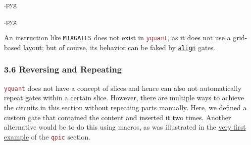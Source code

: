 \documentclass{scrartcl}
\makeatletter
\newenvironment{codeexample}{%
   \VerbatimEnvironment%
   \let\FVB@VerbatimOut\minted@FVB@VerbatimOut
   \let\FVE@VerbatimOut\minted@FVE@VerbatimOut
   \minted@configlang{tex}%
   \minted@fvset
   \begin{VerbatimOut}[codes={\catcode`\^^I=12},firstline,lastline]{\minted@jobname.pyg}%
}{
   \end{VerbatimOut}%
   \minted@langlinenoson%
   \savebox\codeexamplebox{ \minted@jobname.pyg}%
   \ifdim\wd\codeexamplebox>\dimexpr.5\linewidth-3mm\relax%
      \wd\codeexamplebox=.5\linewidth%
   \else%
      \wd\codeexamplebox=\dimexpr\wd\codeexamplebox+3mm\relax%
   \fi%
   \noindent\begin{minipage}{\wd\codeexamplebox}%
      \centering%
      \usebox\codeexamplebox%
   \end{minipage}%
   \begin{minipage}{\dimexpr\linewidth-\wd\codeexamplebox\relax}%
      \expandafter\minted@pygmentize\expandafter{\minted@lang}%
   \end{minipage}%
   \minted@langlinenosoff%
   \par%
}
\newenvironment{codeexample*}{%
   \VerbatimEnvironment%
   \let\FVB@VerbatimOut\minted@FVB@VerbatimOut
   \let\FVE@VerbatimOut\minted@FVE@VerbatimOut
   \minted@configlang{tex}%
   \minted@fvset
   \begin{VerbatimOut}[codes={\catcode`\^^I=12},firstline,lastline]{\minted@jobname.pyg}%
}{
   \end{VerbatimOut}%
   \minted@langlinenoson%
   \begin{adjustbox}{center}
       \minted@jobname.pyg %
   \end{adjustbox}\nopagebreak
   \expandafter\minted@pygmentize\expandafter{\minted@lang}%
   \minted@langlinenosoff%
   \par%
}
\def\pkg#1{\textcolor{brown}{\texttt{#1}}}
\def\gate#1{\hyperref[gate:#1]{\texttt{#1}}}
\def\Yquant{\pkg{yquant}}
\makeatother
\begin{document}
            \begin{example}
               \begin{codeexample}
               \end{codeexample}
            \end{example}

            \begin{example}
               \begin{codeexample}
               \end{codeexample}
               An instruction like \texttt{MIXGATES} does not exist in \Yquant, as it does not use a grid\hyp based layout; but of course, its behavior can be faked by \gate{align} gates.
            \end{example}

         \clearpage
         \subsubsection{3.6 Reversing and Repeating}
            \begin{example}
               \begin{codeexample*}
               \end{codeexample*}
               \Yquant{} does not have a concept of slices and hence can also not automatically repeat gates within a certain slice.
               However, there are multiple ways to achieve the circuits in this section without repeating parts manually.
               Here, we defined a custom gate that contained the content and inserted it two times.
               Another alternative would be to do this using macros, as was illustrated in the \hyperref[ex:qupicfirst]{very first example} of the \pkg{qpic} section.
            \end{example}
\end{document}
